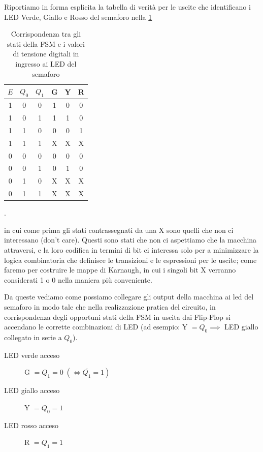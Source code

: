 \documentclass[10pt, a4paper, italian]{article}
\newcommand{\dontcare}{X}
\begin{document}
Riportiamo in forma esplicita la tabella di verità per le uscite che
identificano i LED Verde, Giallo e Rosso del semaforo nella \cref{tab: LED}
\begin{table}[htbp]
    \centering
        \begin{tabular}{c|cc|ccc}
          \toprule
          $E$ & $Q_0$ & $Q_1$ &   G   &   Y   &   R   \\
          \midrule
          \midrule
          1   &     0     &     0     &     1     &     0     &     0     \\
          1   &     0     &     1     &     1     &     1     &     0     \\
          1   &     1     &     0     &     0     &     0     &     1     \\
          1   &     1     &     1     & \dontcare & \dontcare & \dontcare \\
          \midrule
          0   &     0     &     0     &     0     &     0     &     0     \\
          0   &     0     &     1     &     0     &     1     &     0     \\
          0   &     1     &     0     & \dontcare & \dontcare & \dontcare \\
          0   &     1     &     1     & \dontcare & \dontcare & \dontcare \\
          \bottomrule   
    \end{tabular}
    \caption{Corrispondenza tra gli stati della FSM e i valori di tensione
	digitali in ingresso ai LED del semaforo \label{tab: LED}}.     
\end{table}

in cui come prima gli stati contrassegnati da una X sono quelli che non ci
interessano (don't care). Questi sono stati che non ci aspettiamo che la
macchina attraversi, e la loro codifica in termini di bit ci interessa solo
per a minimizzare la logica combinatoria che definisce le transizioni e le
espressioni per le uscite; come faremo per costruire le mappe di Karnaugh, in
cui i singoli bit X verranno considerati 1 o 0 nella maniera più conveniente.

Da queste vediamo come possiamo collegare gli output della macchina ai led del
semaforo in modo tale che nella realizzazione pratica del circuito, in
corrispondenza degli opportuni stati della FSM in uscita dai Flip-Flop si
accendano le corrette combinazioni di LED (ad esempio: Y $= Q_0 \implies$
LED giallo collegato in serie a $Q_0$).
\begin{description}
	\item[LED verde acceso] G $= Q_1 = 0 \; (\iff \overline{Q_1} = 1)$ 
    \item[LED giallo acceso] Y $= Q_0 = 1$
    \item[LED rosso acceso] R $= Q_1 = 1$
\end{description}
\end{document}
